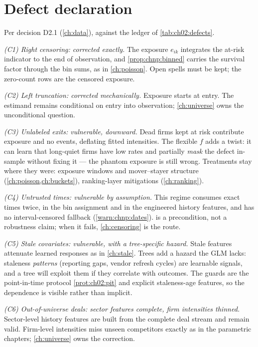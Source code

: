 \section{Defect declaration}\label{chnp:sec:defects}

Per decision D2.1 (\cref{ch:data}), against the ledger of
\cref{tab:ch02:defects}.

\emph{(C1) Right censoring: corrected exactly.} The exposure $e_{ik}$
integrates the at-risk indicator to the end of observation, and
\cref{prop:chnp:binned} carries the survival factor through the bin
sums, as in \cref{ch:poisson}. Open spells must be kept; the zero-count
rows are the censored exposure.

\emph{(C2) Left truncation: corrected mechanically.} Exposure starts at
entry. The estimand remains conditional on entry into observation;
\cref{ch:universe} owns the unconditional question.

\emph{(C3) Unlabeled exits: vulnerable, downward.} Dead firms kept at
risk contribute exposure and no events, deflating fitted intensities.
The flexible $f$ adds a twist: it can learn that long-quiet firms have
low rates and partially \emph{mask} the defect in-sample without fixing
it --- the phantom exposure is still wrong. Treatments stay where they
were: exposure windows and mover--stayer structure
(\cref{ch:poisson,ch:buckets}), ranking-layer mitigations
(\cref{ch:ranking}).

\emph{(C4) Untrusted times: vulnerable by assumption.} This regime
consumes exact times twice, in the bin assignment and in the engineered
history features, and has no interval-censored fallback
(\cref{warn:chnp:dates}).  is a precondition, not
a robustness claim; when it fails, \cref{ch:censoring} is the route.

\emph{(C5) Stale covariates: vulnerable, with a tree-specific hazard.}
Stale features attenuate learned responses as in \cref{ch:stale}. Trees
add a hazard the GLM lacks: staleness \emph{patterns} (reporting gaps,
vendor refresh cycles) are learnable signals, and a tree will exploit
them if they correlate with outcomes. The guards are the point-in-time
protocol \cref{prot:ch02:pit} and explicit staleness-age features, so
the dependence is visible rather than implicit.

\emph{(C6) Out-of-universe deals: sector features complete, firm
intensities thinned.} Sector-level history features are built from the
complete deal stream and remain valid. Firm-level intensities miss
unseen competitors exactly as in the parametric chapters;
\cref{ch:universe} owns the correction.

